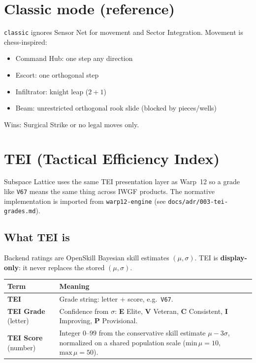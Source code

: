 \documentclass[11pt,a4paper]{article}
\begin{document}
\section{Classic mode (reference)}
\label{sec:classic}

\texttt{classic} ignores Sensor Net for movement and Sector Integration.
Movement is chess-inspired:

\begin{itemize}[leftmargin=*]
  \item Command Hub: one step any direction
  \item Escort: one orthogonal step
  \item Infiltrator: knight leap ($2{+}1$)
  \item Beam: unrestricted orthogonal rook slide (blocked by pieces/wells)
\end{itemize}

Wins: Surgical Strike or no legal moves only.

\section{TEI (Tactical Efficiency Index)}
\label{sec:tei}

Subspace Lattice uses the same TEI presentation layer as Warp~12 so a
grade like \texttt{V67} means the same thing across IWGF products.
The normative implementation is imported from \texttt{warp12-engine}
(see \texttt{docs/adr/003-tei-grades.md}).

\subsection{What TEI is}

Backend ratings are OpenSkill Bayesian skill estimates $(\mu,\sigma)$.
TEI is \textbf{display-only}: it never replaces the stored $(\mu,\sigma)$.

\begin{center}
\begin{tabular}{@{}lp{}@{}}
\toprule
\textbf{Term} & \textbf{Meaning} \\
\midrule
\textbf{TEI}
  & Grade string: letter + score, e.g.\ \texttt{V67}. \\
\textbf{TEI Grade} (letter)
  & Confidence from $\sigma$:
    \textbf{E} Elite, \textbf{V} Veteran, \textbf{C} Consistent,
    \textbf{I} Improving, \textbf{P} Provisional. \\
\textbf{TEI Score} (number)
  & Integer $0$--$99$ from the conservative skill estimate
    $\mu - 3\sigma$, normalized on a shared population scale
    ($\mathrm{min}\,\mu=10$, $\mathrm{max}\,\mu=50$). \\
\bottomrule
\end{tabular}
\end{center}
\end{document}
